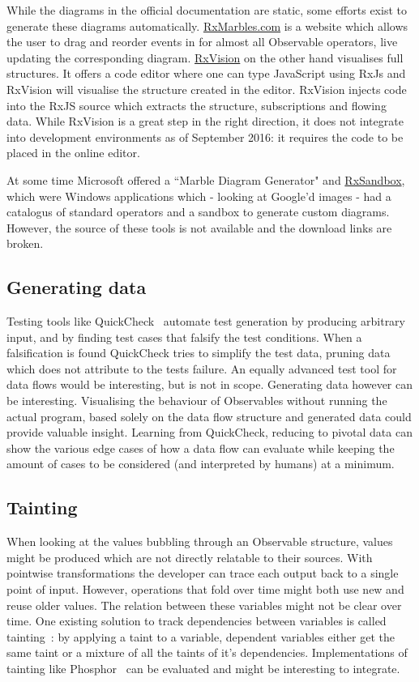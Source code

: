 \documentclass[11pt,a4paper]{article}
\begin{document}
While the diagrams in the official documentation are static, some efforts exist to generate these diagrams automatically. \href{http://RxMarbles.com}{RxMarbles.com} is a website which allows the user to drag and reorder events in for almost all Observable operators, live updating the corresponding diagram.
\href{https://github.com/jaredly/rxvision}{RxVision} on the other hand visualises full structures. It offers a code editor where one can type JavaScript using RxJs and RxVision will visualise the structure created in the editor. RxVision injects code into the RxJS source which extracts the structure, subscriptions and flowing data. While RxVision is a great step in the right direction, it does not integrate into development environments as of September 2016: it requires the code to be placed in the online editor.

At some time Microsoft offered a ``Marble Diagram Generator" and \href{http://mnajder.blogspot.nl/2010/03/rxsandbox-v1.html}{RxSandbox}, which were Windows applications which - looking at Google'd images - had a catalogus of standard operators and a sandbox to generate custom diagrams. However, the source of these tools is not available and the download links are broken.

\subsection{Generating data}
\label{sec:gen-data}
Testing tools like QuickCheck~\cite{quickcheck} automate test generation by producing arbitrary input, and by finding test cases that falsify the test conditions. When a falsification is found QuickCheck tries to simplify the test data, pruning data which does not attribute to the tests failure. An equally advanced test tool for data flows would be interesting, but is not in scope. Generating data however can be interesting. Visualising the behaviour of Observables without running the actual program, based solely on the data flow structure and generated data could provide valuable insight. Learning from QuickCheck, reducing to pivotal data can show the various edge cases of how a data flow can evaluate while keeping the amount of cases to be considered (and interpreted by humans) at a minimum.

\subsection{Tainting}
When looking at the values bubbling through an Observable structure, values might be produced which are not directly relatable to their sources. With pointwise transformations the developer can trace each output back to a single point of input. However, operations that fold over time might both use new and reuse older values. The relation between these variables might not be clear over time. One existing solution to track dependencies between variables is called tainting~\cite{bell2015dynamic}: by applying a taint to a variable, dependent variables either get the same taint or a mixture of all the taints of it's dependencies. Implementations of tainting like Phosphor~\cite{bell2014phosphor} can be evaluated and might be interesting to integrate.
\end{document}
